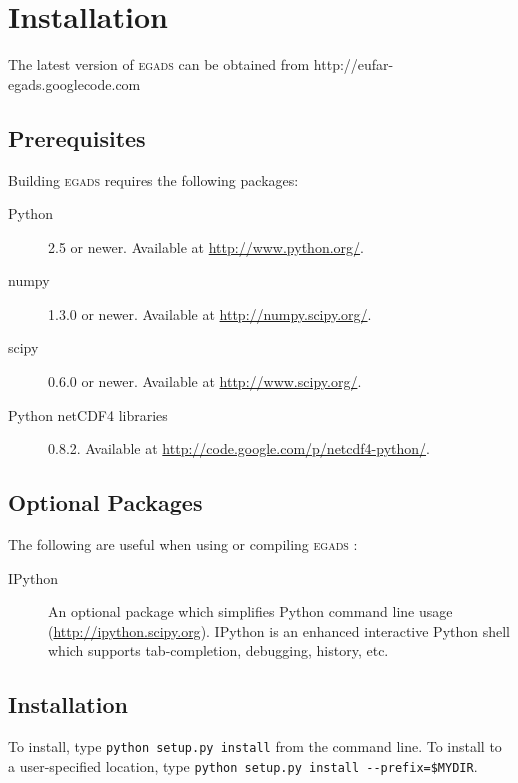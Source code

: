 \documentclass[a4paper,11pt]{report}
\newcommand{\egads}{\textsc{egads} }
\begin{document}
\chapter{Installation}

The latest version of \egads can be obtained from http://eufar-egads.googlecode.com

\section{Prerequisites}

Building \egads requires the following packages:

\begin{description}
 \item[Python] 2.5 or newer. Available at \href{http://www.python.org/}{http://www.python.org/}.
 \item[numpy] 1.3.0 or newer. Available at \href{http://numpy.scipy.org/}{http://numpy.scipy.org/}.
 \item[scipy] 0.6.0 or newer. Available at \href{http://www.scipy.org/}{http://www.scipy.org/}.
 \item[Python netCDF4 libraries] 0.8.2. Available at \href{http://code.google.com/p/netcdf4-python/}{http://code.google.com/p/netcdf4-python/}.

\end{description}

\section{Optional Packages}

The following are useful when using or compiling \egads:

\begin{description}
 \item[IPython] An optional package which simplifies Python command line usage 
(\href{http://ipython.scipy.org}{http://ipython.scipy.org}). IPython is an enhanced interactive Python 
shell which supports tab-completion, debugging, history, etc. 

 \end{description}

\section{Installation}
To install, type \verb|python setup.py install| from the command line. 
To install to a user-specified location, type \verb|python setup.py install --prefix=$MYDIR|. 
\end{document}
